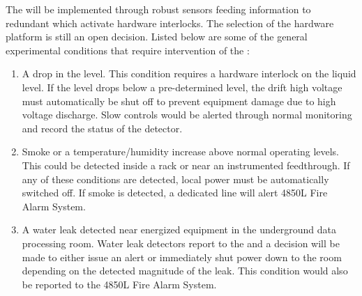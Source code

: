The  will be implemented through robust sensors feeding
information to redundant  which activate hardware
interlocks. The selection of the  hardware platform is
still an open decision.  Listed below are some of the general
 experimental conditions that require intervention of the
:
\begin{enumerate}
 \item A drop in the  level.  This condition requires a hardware
   interlock on the liquid level.  If the level drops below a
   pre-determined level, the drift high voltage must automatically be 
   shut off to prevent equipment damage due to high voltage discharge.  Slow controls would be
   alerted through normal monitoring and record the status of the detector.
 \item Smoke or a temperature/humidity increase above normal operating
   levels. This could be detected inside a rack or near an instrumented
   feedthrough.  If any of these conditions are detected, local
   power must be automatically switched off. If smoke is detected, a
   dedicated line will alert 4850L Fire Alarm System.
 \item A water leak detected near energized equipment in the 
   underground data processing room.  Water leak detectors 
   report to the   and a decision will be made to either
   issue an alert or immediately shut power down to the room depending
   on the detected magnitude of the leak.  This condition would also be reported
   to the 4850L Fire Alarm System.
\end{enumerate}




